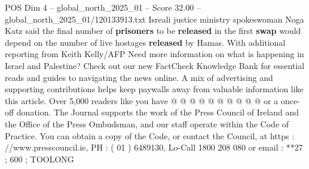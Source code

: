 \begin{textsample}{POS Dim 4 – global\_north\_2025\_01 – Score 32.00 – global\_north\_2025\_01/120133913.txt}
Isreali justice ministry spokeswoman Noga Katz said the final number of \textbf{prisoners} to be \textbf{released} in the first \textbf{swap} would depend on the number of live hostages \textbf{released} by Hamas.
With additional reporting from Keith Kelly/AFP Need more information on what is happening in Israel and Palestine?
Check out our new FactCheck Knowledge Bank for essential reads and guides to navigating the news online.
A mix of advertising and supporting contributions helps keep paywalls away from valuable information like this article.
Over 5,000 readers like you have @ @ @ @ @ @ @ @ @ @ or a once-off donation.
The Journal supports the work of the Press Council of Ireland and the Office of the Press Ombudsman, and our staff operate within the Code of Practice.
You can obtain a copy of the Code, or contact the Council, at https : //www.presscouncil.ie, PH : ( 01 ) 6489130, Lo-Call 1800 208 080 or email : **27 ; 600 ; TOOLONG

\end{textsample}
